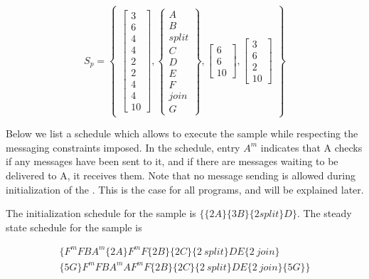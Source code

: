 \begin{displaymath}
S_p = \left\{
\begin{array}{c}
\left[
\begin{array}{c}
3 \\ 6 \\ 4 \\ 4 \\ 2 \\ 2 \\ 4 \\ 4 \\ 10
\end{array}\right],
\left\{
\begin{array}{c}
A \\ B \\ split \\ C \\ D \\ E \\ F \\ join \\ G
\end{array}\right\},
\left[
\begin{array}{c}
6 \\ 6 \\ 10
\end{array}
\right], \left[
\begin{array}{c}
3 \\ 6 \\ 2 \\ 10
\end{array}\right]
\end{array}
\right\}
\end{displaymath}

Below we list a schedule which allows to execute the sample
{\pipeline} while respecting the messaging constraints imposed.  In
the schedule, entry $A^m$ indicates that {\filter} A checks if any
messages have been sent to it, and if there are messages waiting
to be delivered to A, it receives them.  Note that no message
sending is allowed during initialization of the {\pipeline}.  This
is the case for all programs, and will be explained later.

The initialization schedule for the sample {\pipeline} is
$\{\{2A\}\{3B\}\{2split\}D\}$.  The steady state schedule for the
sample {\pipeline} is

$$
\begin{array}{c} \{ F^mFB A^m\{2A\} F^mF \{2B\} \{2C\} \{2\ split\} DE \{2\
join\}
\\ \{5G\} F^mF B A^mA F^mF \{2B\} \{2C\} \{2\ split\} DE \{2\
join\} \{5G\} \}
\end{array}
$$

